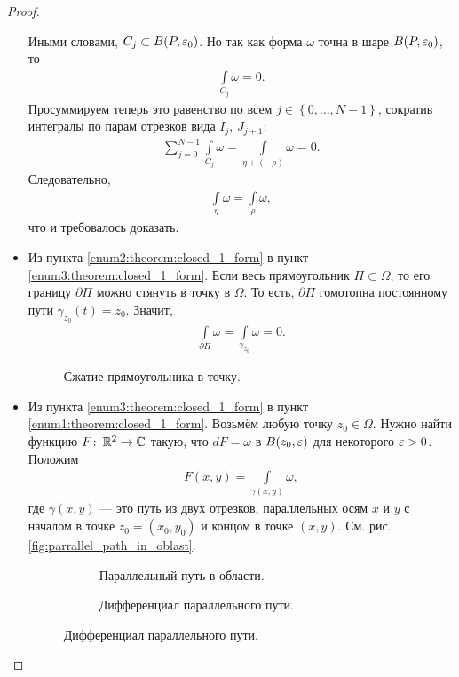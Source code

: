 \documentclass[../complex-analysis.tex]{subfiles}
\begin{document}
\begin{proof}
\begin{itemize}
   Иными словами, $C_j \subset B(P,\varepsilon_0)$. Но так как форма $\omega$ точна в шаре $B(P,\varepsilon_0)$, то
   \begin{align*}
    \int\limits_{C_j} \omega = 0.
   \end{align*} Просуммируем теперь это равенство по всем $j \in \left\{ 0, \ldots,N-1 \right\}$, сократив интегралы по парам отрезков вида $I_j$, $J_{j+1}$:
   \begin{align*}
    \sum_{j=0}^{N-1} \int\limits_{C_j} \omega = \int\limits_{\eta + (- \rho)}  \omega = 0.
   \end{align*} Следовательно,
   \begin{align*}
    \int\limits_{\eta} \omega = \int\limits_{\rho} \omega,  
   \end{align*} что и требовалось доказать.
  \item Из пункта \ref{enum2:theorem:closed_1_form} в пункт \ref{enum3:theorem:closed_1_form}. Если весь прямоугольник $\Pi \subset \Omega$, то его границу $\partial \Pi$ можно стянуть в точку в $\Omega$. То есть, $\partial\Pi$ гомотопна постоянному пути $\gamma_{z_0}(t) = z_0$. Значит,
   \begin{align*}
    \int\limits_{\partial\Pi} \omega = \int\limits_{\gamma_{z_0}}   \omega = 0.
   \end{align*} 
\begin{figure}[ht]
    \centering
    \caption{Сжатие прямоугольника в точку.}
    \label{fig:rectangle_into_point}
\end{figure}

\item Из пункта \ref{enum3:theorem:closed_1_form} в пункт \ref{enum1:theorem:closed_1_form}. Возьмём любую точку $z_0 \in \Omega$. Нужно найти функцию $F \colon\, \mathbb{R}^{2} \to \mathbb{C}$ такую, что $dF = \omega$ в $B(z_0,\varepsilon)$ для некоторого $\varepsilon > 0$. Положим
 \begin{align*}
  F(x,y) = \int\limits_{\gamma(x,y)} \omega,
 \end{align*} где $\gamma(x,y)$ --- это путь из двух отрезков, параллельных осям $x$ и $y$ с началом в точке $z_0 = (x_0, y_0)$ и концом в точке $(x,y)$. См. рис. \eqref{fig:parrallel_path_in_oblast}.

\begin{figure}[h]

\begin{subfigure}{0.5\textwidth}
    \caption{Параллельный путь в области.}
    \label{fig:parrallel_path_in_oblast}
\end{subfigure}
\begin{subfigure}{0.5\textwidth}
    \caption{Дифференциал параллельного пути.}
    \label{fig:differential_of_parallel_path_f}
\end{subfigure}


\end{figure}
\end{itemize}
\end{proof}
\end{document}
